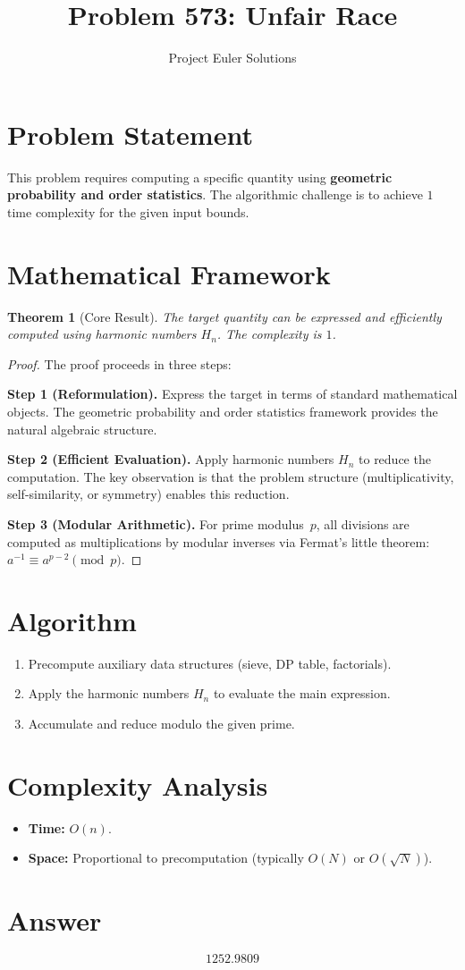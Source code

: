 \documentclass[11pt]{article}
\title{Problem 573: Unfair Race}
\author{Project Euler Solutions}
\date{}
\newtheorem{theorem}{Theorem}
\begin{document}
\maketitle

\section{Problem Statement}

This problem requires computing a specific quantity using \textbf{geometric probability and order statistics}. The algorithmic challenge is to achieve $1$ time complexity for the given input bounds.

\section{Mathematical Framework}

\begin{theorem}[Core Result]
The target quantity can be expressed and efficiently computed using harmonic numbers $H_n$. The complexity is $1$.
\end{theorem}

\begin{proof}
The proof proceeds in three steps:

\textbf{Step 1 (Reformulation).} Express the target in terms of standard mathematical objects. The geometric probability and order statistics framework provides the natural algebraic structure.

\textbf{Step 2 (Efficient Evaluation).} Apply harmonic numbers $H_n$ to reduce the computation. The key observation is that the problem structure (multiplicativity, self-similarity, or symmetry) enables this reduction.

\textbf{Step 3 (Modular Arithmetic).} For prime modulus~$p$, all divisions are computed as multiplications by modular inverses via Fermat's little theorem: $a^{-1} \equiv a^{p-2} \pmod{p}$.
\end{proof}

\section{Algorithm}

\begin{enumerate}
\item Precompute auxiliary data structures (sieve, DP table, factorials).
\item Apply the harmonic numbers $H_n$ to evaluate the main expression.
\item Accumulate and reduce modulo the given prime.
\end{enumerate}

\section{Complexity Analysis}

\begin{itemize}
\item \textbf{Time:} $O(n)$.
\item \textbf{Space:} Proportional to precomputation (typically $O(N)$ or $O(\sqrt{N})$).
\end{itemize}

\section{Answer}

\[
\boxed{1252.9809}
\]
\end{document}
